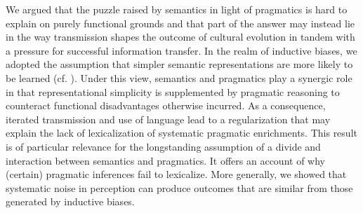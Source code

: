 \documentclass[a4paper]{article}
\begin{document}
We argued that the puzzle raised by semantics in light of pragmatics is hard to explain on purely functional grounds and that part of the answer may instead lie in the way transmission shapes the outcome of cultural evolution in tandem with a pressure for successful information transfer. In the realm of inductive biases, we adopted the assumption that simpler semantic representations are more likely to be learned (cf. \citealt{chater+vitanyi:2003}). Under this view, semantics and pragmatics play a synergic role in that representational simplicity is supplemented by pragmatic reasoning to counteract functional disadvantages otherwise incurred. As a consequence, iterated transmission and use of language lead to a regularization that may explain the lack of lexicalization of systematic pragmatic enrichments. This result is of particular relevance for the longstanding assumption of a divide and interaction between semantics and pragmatics. It offers an account of why (certain) pragmatic inferences fail to lexicalize. More generally, we showed that systematic noise in perception can produce outcomes that are similar from those generated by inductive biases. 
\end{document}
